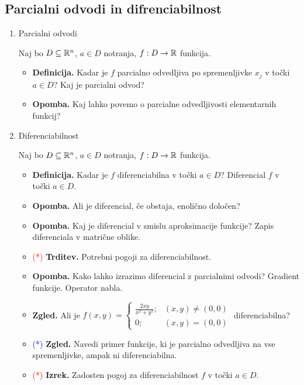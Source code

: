 \subsection{Parcialni odvodi in difrenciabilnost}
\begin{enumerate}
    \item Parcialni odvodi
    
    Naj bo $D \subseteq \mathbb{R}^n$, $a \in D$ notranja, $f: D \to \mathbb{R}$ funkcija.
    
    \begin{itemize}
        \item \textbf{Definicija.} Kadar je $f$ parcialno odvedljiva po spremenljivke $x_j$ v točki $a \in D$? Kaj je parcialni odvod?
        \item \textbf{Opomba.} Kaj lahko povemo o parcialne odvedljivosti elementarnih funkcij?
    \end{itemize}

    \item Diferenciabilnost
    
    Naj bo $D \subseteq \mathbb{R}^n$, $a \in D$ notranja, $f: D \to \mathbb{R}$ funkcija.
    
    \begin{itemize}
        \item \textbf{Definicija.} Kadar je $f$ diferenciabilna v točki $a \in D$? Diferencial $f$ v točki $a \in D$.
        \item \textbf{Opomba.} Ali je diferencial, če obstaja, enolično določen?
        \item \textbf{Opomba.} Kaj je diferencial v smislu aproksimacije funkcije? Zapis diferenciala v matrične oblike.
        \item \textcolor{red}{(*)} \textbf{Trditev.} Potrebni pogoji za diferenciabilnost.
        \item \textbf{Opomba.} Kako lahko izrazimo diferencial z parcialnimi odvodi? Gradient funkcije. Operator nabla.
        \item \textbf{Zgled.} Ali je $f(x, y) = \begin{cases}
            \frac{2xy}{x^2+y^2}; &(x, y) \neq (0,0) \\ 0; &(x, y) = (0,0)
        \end{cases}$ diferenciabilna?
        \item \textcolor{blue}{(*)} \textbf{Zgled.} Navedi primer funkcije, ki je parcialno odvedljiva na vse spremenljivke, ampak ni diferenciabilna.
        \item \textcolor{red}{(*)} \textbf{Izrek.} Zadosten pogoj za diferenciabilnost $f$ v točki $a \in D$.
    \end{itemize}


\end{enumerate}
